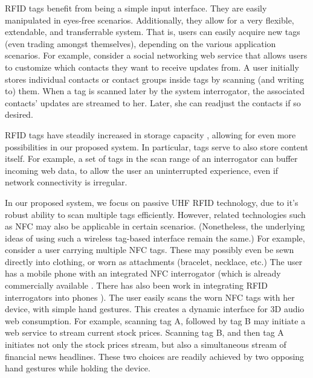\documentclass[conference]{IEEEtran}
\begin{document}
RFID tags benefit from being a simple input interface.  They are easily manipulated in eyes-free scenarios.  Additionally, they allow for a very flexible, extendable, and transferrable system.  That is, users can easily acquire new tags (even trading amongst themselves), depending on the various application scenarios.  For example, consider a social networking web service that allows users to customize which contacts they want to receive updates from.  A user initially stores individual contacts or contact groups inside tags by scanning (and writing to) them.  When a tag is scanned later by the system interrogator, the associated contacts' updates are streamed to her.  Later, she can readjust the contacts if so desired.

RFID tags have steadily increased in storage capacity \cite{web:Tego}, allowing for even more possibilities in our proposed system.  In particular, tags serve to also store content itself.  For example, a set of tags in the scan range of an interrogator can buffer incoming web data, to allow the user an uninterrupted experience, even if network connectivity is irregular.

In our proposed system, we focus on passive UHF RFID technology, due to it's robust ability to scan multiple tags efficiently.  However, related technologies such as NFC may also be applicable in certain scenarios.  (Nonetheless, the underlying ideas of using such a wireless tag-based interface remain the same.)  For example, consider a user carrying multiple NFC tags.  These may possibly even be sewn directly into clothing, or worn as attachments (bracelet, necklace, etc.)  The user has a mobile phone with an integrated NFC interrogator (which is already commercially available \cite{web:NFC}.  There has also been work in integrating RFID interrogators into phones \cite{2009Savolainen}).  The user easily scans the worn NFC tags with her device, with simple hand gestures.  This creates a dynamic interface for 3D audio
web consumption.  For example, scanning tag A, followed by tag B may initiate a web service to stream current stock prices.  Scanning tag B, and then tag A initiates not only the stock prices stream, but also a simultaneous stream of financial news headlines.  These two choices are readily achieved by two opposing hand gestures while holding the device.
\end{document}
